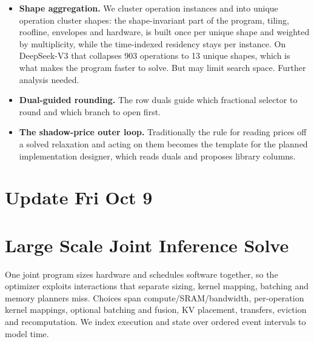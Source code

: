 \documentclass[10pt]{article}
\newcommand{\lede}[1]{{\color{ink2}#1\par}\vspace{2pt}}
\newenvironment{tight}
  {\begin{itemize}[leftmargin=13pt,itemsep=4pt,topsep=4pt,parsep=0pt,
     label=\textcolor{ink3}{\footnotesize$\bullet$}]\color{ink2}}
  {\end{itemize}}
\newcommand{\tnote}[1]{\par\vspace{4pt}{\fontsize{8.4}{10.6}\selectfont\color{ink3}#1\par}}
\begin{document}
\begin{tight}
\item \textbf{\color{ink}Shape aggregation.} We cluster operation instances and into unique operation
cluster shapes: the shape-invariant part of the program, tiling, roofline,
envelopes and hardware, is built once per unique shape and weighted by
multiplicity, while the time-indexed residency stays per instance. On
DeepSeek-V3 that collapses 903 operations to 13 unique shapes, which is what
makes the program faster to solve. But may limit search space. Further analysis needed.
\item \textbf{\color{ink}Dual-guided rounding.} The row duals guide which fractional selector to round
and which branch to open first.
\item \textbf{\color{ink}The shadow-price outer loop.} Traditionally the rule for reading
prices off a solved relaxation and acting on them becomes the template for the
planned implementation designer, which reads duals and proposes library columns.
\end{tight}
\tnote{}

\section{Update Fri Oct 9}
\section{Large Scale Joint Inference Solve}
\lede{One joint program sizes hardware and schedules software together, so the
optimizer exploits interactions that separate sizing, kernel mapping, batching and
memory planners miss. Choices span compute/SRAM/bandwidth, per-operation kernel
mappings, optional batching and fusion, KV placement, transfers, eviction and
recomputation. We index execution and state over ordered event intervals to model time.}
\end{document}
